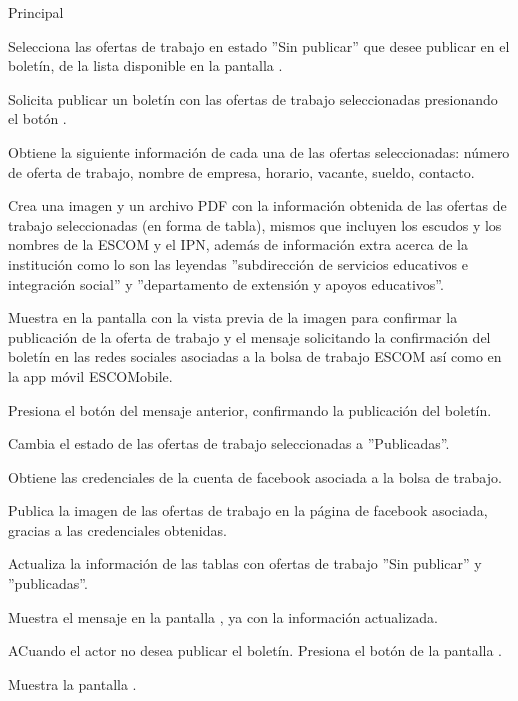 	\begin{UCtrayectoria}{Principal}

		\UCpaso [\UCactor] Selecciona las ofertas de trabajo en estado ''Sin publicar'' que desee publicar en el boletín, de la lista disponible en la pantalla .

		\UCpaso[\UCactor] Solicita publicar un boletín con las ofertas de trabajo seleccionadas presionando el botón .

		\UCpaso Obtiene la siguiente información de cada una de las ofertas seleccionadas: número de oferta de trabajo, nombre de empresa, horario, vacante, sueldo, contacto.
		
		\UCpaso Crea una imagen y un archivo PDF con la información obtenida de las ofertas de trabajo seleccionadas (en forma de tabla), mismos que incluyen los escudos y los nombres de la ESCOM y el IPN, además de información extra acerca de la institución como lo son las leyendas ''subdirección de servicios educativos e integración social'' y ''departamento de extensión y apoyos educativos''. 

		\UCpaso Muestra en la pantalla  con la vista previa de la imagen para confirmar la publicación de la oferta de trabajo y el mensaje  solicitando la confirmación del boletín en las redes sociales asociadas a la bolsa de trabajo ESCOM así como en la app móvil ESCOMobile.

		\UCpaso [\UCactor] Presiona el botón  del mensaje anterior, confirmando la publicación del boletín.  
	
		\UCpaso Cambia el estado de las ofertas de trabajo seleccionadas a ''Publicadas''.

		\UCpaso Obtiene las credenciales de la cuenta de facebook asociada a la bolsa de trabajo.

		\UCpaso Publica la imagen de las ofertas de trabajo en la página de facebook asociada, gracias a las credenciales obtenidas.

		\UCpaso Actualiza la información de las tablas con ofertas de trabajo ''Sin publicar'' y ''publicadas''.

		\UCpaso Muestra el mensaje  en la pantalla , ya con la información actualizada.
	
	\end{UCtrayectoria}

	\begin{UCtrayectoriaA}{A}{Cuando el actor no desea publicar el boletín.}
		\UCpaso [\UCactor] Presiona el botón   de la pantalla .

		\UCpaso Muestra la pantalla .   
	\end{UCtrayectoriaA}
